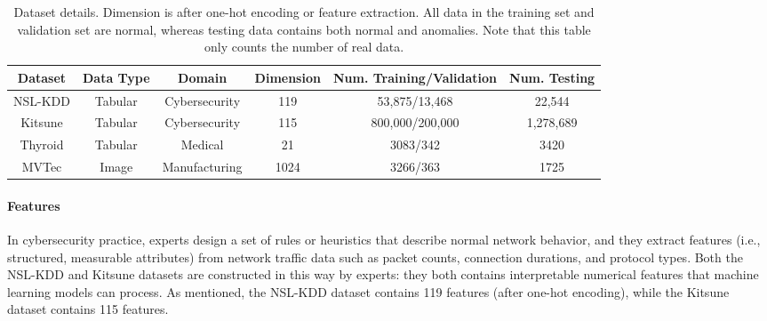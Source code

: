 \documentclass{article}
\begin{document}
\begin{table}[h]
    \centering
    \caption{Dataset details. Dimension is after one-hot encoding or feature extraction. 
        All data in the training set and validation set are normal, whereas testing data contains both normal and anomalies. Note that this table only counts the number of real data. }
    \begin{tabular}{c|ccccc}
    \toprule
    Dataset     & Data Type & Domain        & Dimension   & Num. Training/Validation & Num. Testing  \\
    \midrule
    NSL-KDD     & Tabular   & Cybersecurity & 119  & 53,875/13,468 & 22,544 \\
       Kitsune & Tabular   & Cybersecurity       & 115  & 800,000/200,000 & 1,278,689 \\
    Thyroid     & Tabular   & Medical       & 21   &  3083/342 & 3420\\
    MVTec       & Image     & Manufacturing & 1024 & 3266/363 & 1725\\
        \bottomrule
    \end{tabular}
    \label{tab:dataset_details}
\end{table} 

\paragraph*{Features}
In cybersecurity practice, experts design a set of rules or heuristics that describe normal network behavior, and they extract features (i.e., structured, measurable attributes) from network traffic data such as packet counts, connection durations, and protocol types. Both the NSL-KDD and Kitsune datasets are constructed in this way by experts: they both contains interpretable numerical features that machine learning models can process. As mentioned, the NSL-KDD dataset contains 119 features (after one-hot encoding), while the Kitsune dataset contains 115 features.
\end{document}
